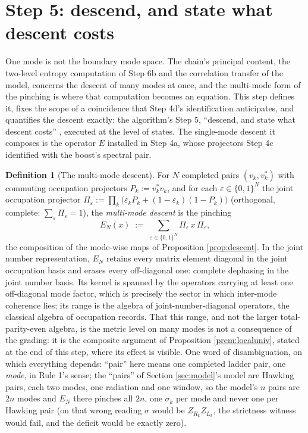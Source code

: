 \documentclass[11pt]{article}
\theoremstyle{definition}
\newtheorem{definition}[theorem]{Definition}
\newcommand{\EN}{E_{N}}
\begin{document}
\section{Step 5: descend, and state what descent costs}\label{sec:descent}

One mode is not the boundary mode space. The chain's principal content, the two-level entropy computation of Step 6b and the correlation transfer of the model, concerns the descent of many modes at once, and the multi-mode form of the pinching is where that computation becomes an equation. This step defines it, fixes the scope of a coincidence that Step 4d's identification anticipates, and quantifies the descent exactly: the algorithm's Step 5, ``descend, and state what descent costs'' \cite[\S 8.1, Step 5]{ButlerT1}, executed at the level of states. The single-mode descent it composes is the operator $E$ installed in Step 4a, whose projectors Step 4c identified with the boost's spectral pair.

\begin{definition}[The multi-mode descent]\label{def:multidescent}
For $N$ completed pairs $(v_k, v_k^*)$ with commuting occupation projectors $P_k := v_k^* v_k$, and for each $\varepsilon \in \{0,1\}^N$ the joint occupation projector $\Pi_\varepsilon := \prod_k \bigl(\varepsilon_k P_k + (1 - \varepsilon_k)(1 - P_k)\bigr)$ (orthogonal, complete: $\sum_\varepsilon \Pi_\varepsilon = 1$), the \emph{multi-mode descent} is the pinching
\[
\EN(x) \;:=\; \sum_{\varepsilon \in \{0,1\}^N} \Pi_\varepsilon\, x\, \Pi_\varepsilon ,
\]
the composition of the mode-wise maps of Proposition \ref{prop:descent}. In the joint number representation, $\EN$ retains every matrix element diagonal in the joint occupation basis and erases every off-diagonal one: complete dephasing in the joint number basis. Its kernel is spanned by the operators carrying at least one off-diagonal mode factor, which is precisely the sector in which inter-mode coherence lies; its range is the algebra of joint-number-diagonal operators, the classical algebra of occupation records. That this range, and not the larger total-parity-even algebra, is the metric level on many modes is not a consequence of the grading: it is the composite argument of Proposition \ref{prem:localuniv}, stated at the end of this step, where its effect is visible. One word of disambiguation, on which everything depends: ``pair'' here means one completed ladder pair, one \emph{mode}, in Rule 1's sense; the ``pairs'' of Section \ref{sec:model}'s model are Hawking pairs, each two modes, one radiation and one window, so the model's $n$ pairs are $2n$ modes and $\EN$ there pinches all $2n$, one $\sigma_k$ per mode and never one per Hawking pair (on that wrong reading $\sigma$ would be $Z_{R_k}Z_{L_k}$, the strictness witness would fail, and the deficit would be exactly zero).
\end{definition}
\end{document}
